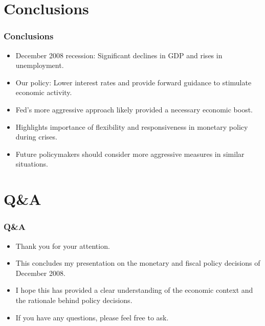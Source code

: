 \documentclass{beamer}
\begin{document}
\section{Conclusions}
\begin{frame}
    \frametitle{Conclusions}
    \begin{itemize}
        \item December 2008 recession: Significant declines in GDP and rises in unemployment.
        \item Our policy: Lower interest rates and provide forward guidance to stimulate economic activity.
        \item Fed's more aggressive approach likely provided a necessary economic boost.
        \item Highlights importance of flexibility and responsiveness in monetary policy during crises.
        \item Future policymakers should consider more aggressive measures in similar situations.
    \end{itemize}
\end{frame}

\section{Q\&A}
\begin{frame}
    \frametitle{Q\&A}
    \begin{itemize}
        \item Thank you for your attention.
        \item This concludes my presentation on the monetary and fiscal policy decisions of December 2008.
        \item I hope this has provided a clear understanding of the economic context and the rationale behind policy decisions.
        \item If you have any questions, please feel free to ask.
    \end{itemize}
\end{frame}
\end{document}
